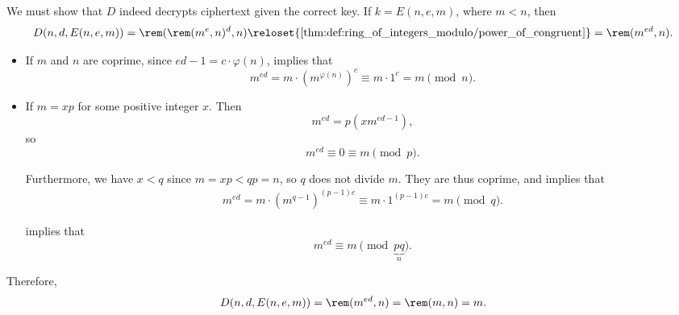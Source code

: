 \begin{defproof}
  We must show that \( D \) indeed decrypts ciphertext given the correct key. If \( k = E(n, e, m) \), where \( m < n \), then
  \begin{equation*}
    D(n, d, E(n, e, m))
    =
    \rem(\rem(m^e, n)^d, n)
    \reloset {\ref{thm:def:ring_of_integers_modulo/power_of_congruent}} =
    \rem(m^{ed}, n).
  \end{equation*}

  \begin{itemize}
    \item If \( m \) and \( n \) are coprime, since \( ed - 1 = c \cdot \varphi(n) \),  implies that
    \begin{equation*}
      m^{ed} = m \cdot (m^{\varphi(n)})^c \equiv m \cdot 1^c = m \pmod n.
    \end{equation*}

    \item If \( m = xp \) for some positive integer \( x \). Then
    \begin{equation*}
      m^{ed} = p (xm^{ed - 1}),
    \end{equation*}
    so
    \begin{equation*}
      m^{ed} \equiv 0 \equiv m \pmod p.
    \end{equation*}

    Furthermore, we have \( x < q \) since \( m = xp < qp = n \), so \( q \) does not divide \( m \). They are thus coprime, and  implies that
    \begin{align*}
      m^{ed} = m \cdot (m^{q - 1})^{(p - 1) c} \equiv m \cdot 1^{(p - 1) c} = m \pmod q.
    \end{align*}

     implies that
    \begin{equation*}
      m^{ed} \equiv m \pmod {\underbrace{pq}_n}.
    \end{equation*}
  \end{itemize}

  Therefore,
  \begin{equation*}
    D(n, d, E(n, e, m)) = \rem(m^{ed}, n) = \rem(m, n) = m.
  \end{equation*}
\end{defproof}


